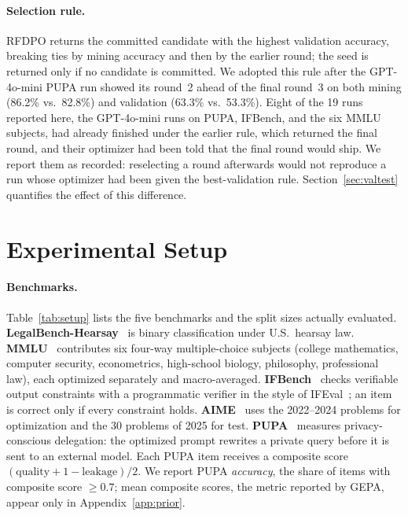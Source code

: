 \documentclass[11pt]{article}
\begin{document}
\paragraph{Selection rule.}
\label{sec:selection}
RFDPO returns the committed candidate with the highest validation accuracy, breaking ties by mining accuracy and then by the earlier round; the seed is returned only if no candidate is committed. We adopted this rule after the GPT-4o-mini PUPA run showed its round~2 ahead of the final round~3 on both mining (86.2\% vs.\ 82.8\%) and validation (63.3\% vs.\ 53.3\%). Eight of the 19 runs reported here, the GPT-4o-mini runs on PUPA, IFBench, and the six MMLU subjects, had already finished under the earlier rule, which returned the final round, and their optimizer had been told that the final round would ship. We report them as recorded: reselecting a round afterwards would not reproduce a run whose optimizer had been given the best-validation rule. Section~\ref{sec:valtest} quantifies the effect of this difference.

\section{Experimental Setup}
\label{sec:setup}

\paragraph{Benchmarks.}
Table~\ref{tab:setup} lists the five benchmarks and the split sizes actually evaluated. \textbf{LegalBench-Hearsay}~\citep{guha2023legalbench} is binary classification under U.S.\ hearsay law. \textbf{MMLU}~\citep{hendrycks2021mmlu} contributes six four-way multiple-choice subjects (college mathematics, computer security, econometrics, high-school biology, philosophy, professional law), each optimized separately and macro-averaged. \textbf{IFBench}~\citep{pyatkin2025ifbench} checks verifiable output constraints with a programmatic verifier in the style of IFEval~\citep{zhou2023ifeval}; an item is correct only if every constraint holds. \textbf{AIME}~\citep{maa2025aime} uses the 2022--2024 problems for optimization and the 30 problems of 2025 for test. \textbf{PUPA}~\citep{li2025papillon} measures privacy-conscious delegation: the optimized prompt rewrites a private query before it is sent to an external model. Each PUPA item receives a composite score $(\mathrm{quality}+1-\mathrm{leakage})/2$. We report PUPA \emph{accuracy}, the share of items with composite score $\geq 0.7$; mean composite scores, the metric reported by GEPA, appear only in Appendix~\ref{app:prior}.
\end{document}
